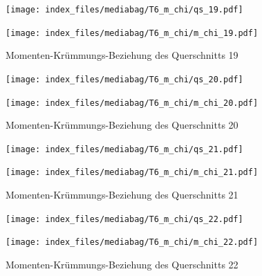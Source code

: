 \documentclass[
  11pt,
  letterpaper,
]{scrreprt}
\begin{document}
\begin{figure}[H]

\begin{minipage}{0.50\linewidth}
\texttt{[image: index\_files/mediabag/T6\_m\_chi/qs\_19.pdf]}\end{minipage}%
%
\begin{minipage}{0.50\linewidth}
\texttt{[image: index\_files/mediabag/T6\_m\_chi/m\_chi\_19.pdf]}\end{minipage}%

\caption{\label{fig-mchi_anhang}Momenten-Krümmungs-Beziehung des
Querschnitts 19}

\end{figure}%

\begin{figure}[H]

\begin{minipage}{0.50\linewidth}
\texttt{[image: index\_files/mediabag/T6\_m\_chi/qs\_20.pdf]}\end{minipage}%
%
\begin{minipage}{0.50\linewidth}
\texttt{[image: index\_files/mediabag/T6\_m\_chi/m\_chi\_20.pdf]}\end{minipage}%

\caption{\label{fig-mchi_anhang}Momenten-Krümmungs-Beziehung des
Querschnitts 20}

\end{figure}%

\begin{figure}[H]

\begin{minipage}{0.50\linewidth}
\texttt{[image: index\_files/mediabag/T6\_m\_chi/qs\_21.pdf]}\end{minipage}%
%
\begin{minipage}{0.50\linewidth}
\texttt{[image: index\_files/mediabag/T6\_m\_chi/m\_chi\_21.pdf]}\end{minipage}%

\caption{\label{fig-mchi_anhang}Momenten-Krümmungs-Beziehung des
Querschnitts 21}

\end{figure}%

\begin{figure}[H]

\begin{minipage}{0.50\linewidth}
\texttt{[image: index\_files/mediabag/T6\_m\_chi/qs\_22.pdf]}\end{minipage}%
%
\begin{minipage}{0.50\linewidth}
\texttt{[image: index\_files/mediabag/T6\_m\_chi/m\_chi\_22.pdf]}\end{minipage}%

\caption{\label{fig-mchi_anhang}Momenten-Krümmungs-Beziehung des
Querschnitts 22}

\end{figure}%
\end{document}
